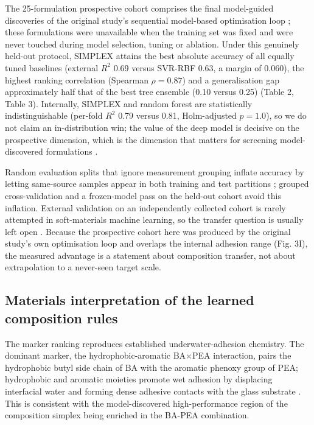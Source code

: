 \documentclass[utf8]{FrontiersinHarvard}
\begin{document}
The 25-formulation prospective cohort comprises the final model-guided discoveries of the original study's sequential model-based optimisation loop \cite{liao2025nature}; these formulations were unavailable when the training set was fixed and were never touched during model selection, tuning or ablation. Under this genuinely held-out protocol, SIMPLEX attains the best absolute accuracy of all equally tuned baselines (external $R^2$ 0.69 versus SVR-RBF 0.63, a margin of 0.060), the highest ranking correlation (Spearman $\rho = 0.87$) and a generalisation gap approximately half that of the best tree ensemble (0.10 versus 0.25) (Table 2, Table 3). Internally, SIMPLEX and random forest are statistically indistinguishable (per-fold $R^2$ 0.79 versus 0.81, Holm-adjusted $p = 1.0$), so we do not claim an in-distribution win; the value of the deep model is decisive on the prospective dimension, which is the dimension that matters for screening model-discovered formulations \cite{ovadia2019uncertainty,shen2021ood,mouret2017realitygap}.

Random evaluation splits that ignore measurement grouping inflate accuracy by letting same-source samples appear in both training and test partitions \cite{ovadia2019uncertainty,quinonero2009dataset}; grouped cross-validation and a frozen-model pass on the held-out cohort avoid this inflation. External validation on an independently collected cohort is rarely attempted in soft-materials machine learning, so the transfer question is usually left open \cite{mouret2017realitygap,shen2021ood,gulrajani2021domain}. Because the prospective cohort here was produced by the original study's own optimisation loop and overlaps the internal adhesion range (Fig. 3I), the measured advantage is a statement about composition transfer, not about extrapolation to a never-seen target scale.

\subsection{Materials interpretation of the learned composition rules}

The marker ranking reproduces established underwater-adhesion chemistry. The dominant marker, the hydrophobic-aromatic BA$\times$PEA interaction, pairs the hydrophobic butyl side chain of BA with the aromatic phenoxy group of PEA; hydrophobic and aromatic moieties promote wet adhesion by displacing interfacial water and forming dense adhesive contacts with the glass substrate \cite{cai2021bioadhesives,maier2015saltdisplacement,narayanan2021underwater,zhang2020catechol,lee2007mussel,waite2017mussel}. This is consistent with the model-discovered high-performance region of the composition simplex being enriched in the BA-PEA combination.
\end{document}
